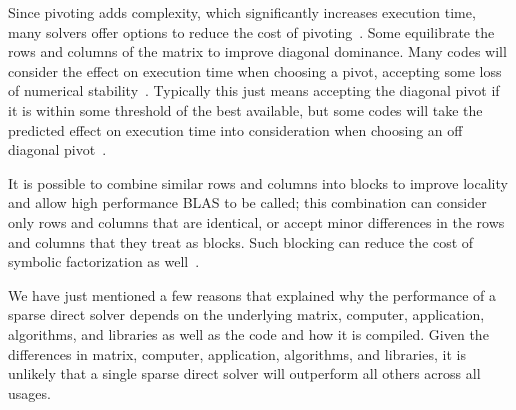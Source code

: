 \documentclass[acmtoms,acmnow]{acmtrans2m}
\begin{document}
Since pivoting adds complexity, which significantly increases
execution time, many solvers offer options to reduce the cost of
pivoting~\cite{LiDemmel509092,sg:04-fgcs}.  Some equilibrate the
rows and columns of the matrix to improve diagonal dominance.  Many
codes will consider the effect on execution time when choosing a
pivot, accepting some loss of numerical
stability~\cite{Malard126136}. Typically this just means accepting
the diagonal pivot if it is within some threshold of the best
available, but some codes will take the predicted effect on
execution time into consideration when choosing an off diagonal
pivot~\cite{Davis992205}.

It is possible to combine similar rows and columns into blocks to
improve locality and allow high performance BLAS to be called; this
combination can consider only rows and columns that are identical,
or accept minor differences in the rows and columns that they treat
as blocks.  Such blocking can reduce the cost of symbolic
factorization as well~\cite{amestoy01analysis}.

We have just mentioned a few reasons that explained why
the performance of a sparse direct solver depends on the underlying
matrix, computer, application, algorithms, and libraries as well as
the code and how it is compiled.
Given the differences in matrix, computer, application, algorithms,
and libraries, it is unlikely that a single sparse direct solver will
outperform all others across all usages.



\end{document}
